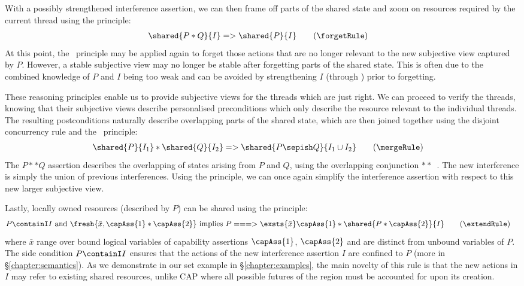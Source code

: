 With a possibly strengthened interference assertion, we can then frame off parts of the shared state and zoom on resources required by the current thread using the \forgetRule principle: 
%
\begin{align*}\label{eq:forget}
  \shared{P * Q}{I} &=> \shared{P}{I}  \tag{\forgetRule}
\end{align*}
%
At this point, the \shiftRule\ principle may be applied again to forget those actions that are no longer relevant to the new subjective view captured by  $P$. 
 However, a stable subjective view may no longer be stable after forgetting parts of the shared state. This is often due to the combined knowledge of $P$ and $I$ being too weak and can be avoided by strengthening $I$ (through \shiftRule) prior to forgetting. 

These reasoning principles enable us to provide subjective views for the threads which are just right. 
We can proceed to verify the threads, knowing that their subjective views describe personalised preconditions which only describe the resource relevant to the individual threads. The resulting postconditions naturally describe overlapping parts of the shared state, which are then joined together using the disjoint concurrency rule and the \mergeRule\ principle: 
%
\begin{align*}\label{eq:merge}
  \shared{P}{I_1} * \shared{Q}{I_2} &=> \shared{P \sepish Q}{I_1 \cup I_2} \tag{\mergeRule}
\end{align*}
%
The $P ** Q$ assertion describes the overlapping of states arising from $P$ and $Q$, using the overlapping conjunction $**$~\cite{ramification,js-popl12}. 
The new interference is simply the union of previous interferences. Using the \shiftRule principle, we can once again simplify the interference assertion with respect to this new larger subjective view.

Lastly, locally owned resources (described by $P$) can be shared using the \extendRule principle: 
%
\begin{align}\label{eq:extend}
	 &\hspace{0pt} P \containI I 
  \text{ and }
  \fresh{\bar{x}, \capAss{1} * \capAss{2}}
  \text{ implies } 
  P ===>
  \exsts{\bar{x}} \capAss{1} * \shared{P * \capAss{2}}{I}
  \tag{\extendRule}
\end{align}
%
where $\bar{x}$ range over bound logical variables of capability assertions $\capAss{1}$, $\capAss{2}$ and are distinct from unbound variables of $P$. %
%
The side condition $P \containI I$ ensures that the actions of the new interference assertion $I$ are confined to $P$ (more in \S\ref{chapter:semantics}).
%
As we demonstrate in our set example in \S\ref{chapter:examples}, the main novelty of this rule is that the new actions in $I$ may refer to existing shared resources, unlike CAP where all possible futures of the region must be accounted for upon its creation. 

